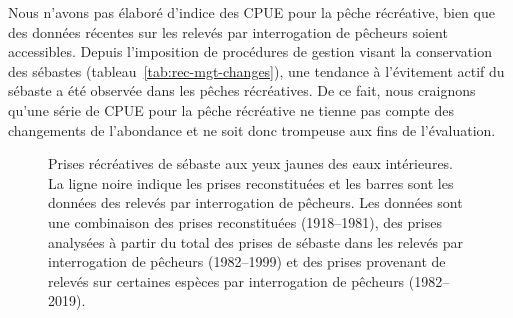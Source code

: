 \documentclass[french,11pt]{book}
\begin{document}
Nous n'avons pas élaboré d'indice des CPUE pour la pêche récréative, bien que des données récentes sur les relevés par interrogation de pêcheurs soient accessibles. Depuis l'imposition de procédures de gestion visant la conservation des sébastes (tableau~\ref{tab:rec-mgt-changes}), une tendance à l'évitement actif du sébaste a été observée dans les pêches récréatives. De ce fait, nous craignons qu'une série de CPUE pour la pêche récréative ne tienne pas compte des changements de l'abondance et ne soit donc trompeuse aux fins de l'évaluation.
\begin{figure}[htb]

{\centering {} 

}

\caption{Prises récréatives de sébaste aux yeux jaunes des eaux intérieures. La ligne noire indique les prises reconstituées et les barres sont les données des relevés par interrogation de pêcheurs. Les données sont une combinaison des prises reconstituées (1918--1981), des prises analysées à partir du total des prises de sébaste dans les relevés par interrogation de pêcheurs (1982--1999) et des prises provenant de relevés sur certaines espèces par interrogation de pêcheurs (1982--2019).}\label{fig:reccatch}
\end{figure}
\end{document}
